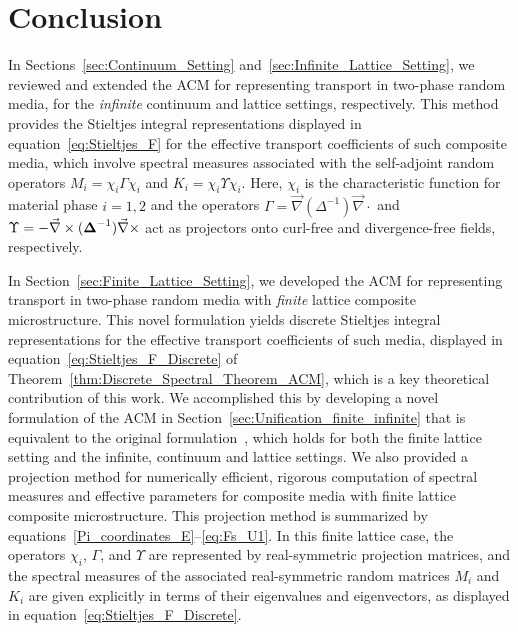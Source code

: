 \documentclass{cmslatex}
\newcommand\bDelta{\mbox{\boldmath${\Delta}$}}
\begin{document}
\section{Conclusion}
%
In Sections~\ref{sec:Continuum_Setting}
and~\ref{sec:Infinite_Lattice_Setting}, we reviewed and extended the ACM for
representing transport in two-phase random media, for the
\emph{infinite} continuum and lattice settings, respectively. This
method provides the Stieltjes integral representations displayed in
equation~\eqref{eq:Stieltjes_F} for the effective transport
coefficients of such composite media, which involve spectral measures
associated with the self-adjoint random operators $M_i=\chi_i\Gamma\chi_i$ and
$K_i=\chi_i\Upsilon\chi_i$. Here, $\chi_i$ is the characteristic function for material
phase $i=1,2$ and the operators $\Gamma=\vec{\nabla}(\Delta^{-1})\vec{\nabla}\cdot$ and
$\Upsilon=-\vec{\nabla}\times(\bDelta^{-1})\vec{\nabla}\times$ act as projectors onto curl-free
and divergence-free fields, respectively. 






In Section~\ref{sec:Finite_Lattice_Setting}, we developed the ACM for
representing transport in two-phase random media with \emph{finite}
lattice composite microstructure. This novel formulation yields
discrete Stieltjes integral representations for the effective
transport coefficients of such media, displayed in
equation~\eqref{eq:Stieltjes_F_Discrete} of 
Theorem~\ref{thm:Discrete_Spectral_Theorem_ACM}, which is a key
theoretical contribution of this work. We accomplished this by
developing a novel formulation of the ACM in
Section~\ref{sec:Unification_finite_infinite} that is equivalent to
the original formulation~\cite{Golden:CMP-473}, which holds for both the
finite lattice setting and the infinite, continuum and lattice
settings. We also provided a projection method for numerically
efficient, rigorous computation of spectral measures and effective
parameters for composite media with finite lattice composite
microstructure. This projection method is summarized by
equations~\eqref{Pi_coordinates_E}--\eqref{eq:Fs_U1}. In this finite
lattice case, the operators $\chi_i$, $\Gamma$, and $\Upsilon$ are represented by
real-symmetric projection matrices, and the spectral measures of the
associated real-symmetric random matrices $M_i$ and $K_i$ are given
explicitly in terms of their eigenvalues and eigenvectors, as
displayed in equation~\eqref{eq:Stieltjes_F_Discrete}.  
\end{document}
